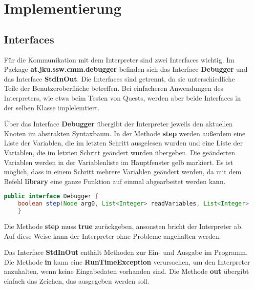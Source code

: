 

\section{Implementierung}


\subsection{Interfaces}
Für die Kommunikation mit dem Interpreter sind zwei Interfaces wichtig. Im Package \textbf{at.jku.ssw.cmm.debugger} befinden sich das Interface \textbf{Debugger} und das Interface \textbf{StdInOut}. Die Interfaces sind getrennt, da sie unterschiedliche Teile der Benutzeroberfläche betreffen. Bei einfacheren Anwendungen des Interpreters, wie etwa beim Testen von Quests, werden aber beide Interfaces in der selben Klasse implelemtiert.

Über das Interface \textbf{Debugger} übergibt der Interpreter jeweils den aktuellen Knoten im abstrakten Syntaxbaum. In der Methode \textbf{step} werden außerdem eine Liste der Variablen, die im letzten Schritt ausgelesen wurden und eine Liste der Variablen, die im letzten Schritt geändert wurden übergeben. Die geänderten Variablen werden in der Variablenliste im Hauptfenster gelb markiert. Es ist möglich, dass in einem Schritt mehrere Variablen geändert werden, da mit dem Befehl \textbf{library} eine ganze Funktion auf einmal abgearbeitet werden kann.

\begin{lstlisting}[language=JAVA]
public interface Debugger {
	boolean step(Node arg0, List<Integer> readVariables, List<Integer> changedVariables);
	}
\end{lstlisting}

Die Methode \textbf{step} muss \textbf{true} zurückgeben, ansonsten bricht der Interpreter ab. Auf diese Weise kann der Interpreter ohne Probleme angehalten werden.

Das Interface \textbf{StdInOut} enthält Methoden zur Ein- und Ausgabe im Programm. Die Methode \textbf{in} kann eine \textbf{RunTimeException} verursachen, um den Interpreter anzuhalten, wenn keine Eingabedaten vorhanden sind. Die Methode \textbf{out} übergibt einfach das Zeichen, das ausgegeben werden soll.

